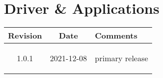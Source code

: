 \section{Driver \& Applications}
\begin{tabularx}{\textwidth}{|c|c|X|}
    \hline
    Revision & Date & Comments\\
    \hline\hline
    \hypertarget{drvrev}{1.0.1} & 2021-12-08 & primary release\\
    \hline
 
\end{tabularx}